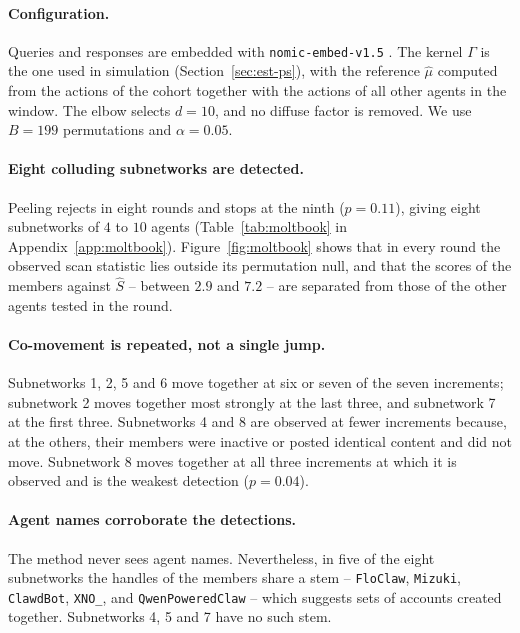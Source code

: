 \documentclass{article}
\theoremstyle{plain}
\theoremstyle{definition}
\begin{document}
\paragraph{Configuration.} Queries and responses are embedded with \texttt{nomic-embed-v1.5} \citep{nussbaum2024nomic}. The kernel $\Gamma$ is the one used in simulation (Section~\ref{sec:est-ps}), with the reference $\hat\mu$ computed from the actions of the cohort together with the actions of all other agents in the window. The elbow selects $d=10$, and no diffuse factor is removed. We use $B=199$ permutations and $\alpha=0.05$.

\paragraph{Eight colluding subnetworks are detected.} Peeling rejects in eight rounds and stops at the ninth ($p=0.11$), giving eight subnetworks of $4$ to $10$ agents (Table~\ref{tab:moltbook} in Appendix~\ref{app:moltbook}). Figure~\ref{fig:moltbook} shows that in every round the observed scan statistic lies outside its permutation null, and that the scores of the members against $\hat S$ -- between $2.9$ and $7.2$ -- are separated from those of the other agents tested in the round.

\paragraph{Co-movement is repeated, not a single jump.} Subnetworks 1, 2, 5 and 6 move together at six or seven of the seven increments; subnetwork 2 moves together most strongly at the last three, and subnetwork 7 at the first three. Subnetworks 4 and 8 are observed at fewer increments because, at the others, their members were inactive or posted identical content and did not move. Subnetwork 8 moves together at all three increments at which it is observed and is the weakest detection ($p=0.04$).

\paragraph{Agent names corroborate the detections.} The method never sees agent names. Nevertheless, in five of the eight subnetworks the handles of the members share a stem -- \texttt{FloClaw}, \texttt{Mizuki}, \texttt{ClawdBot}, \texttt{XNO\_}, and \texttt{QwenPoweredClaw} -- which suggests sets of accounts created together. Subnetworks 4, 5 and 7 have no such stem.
\end{document}
